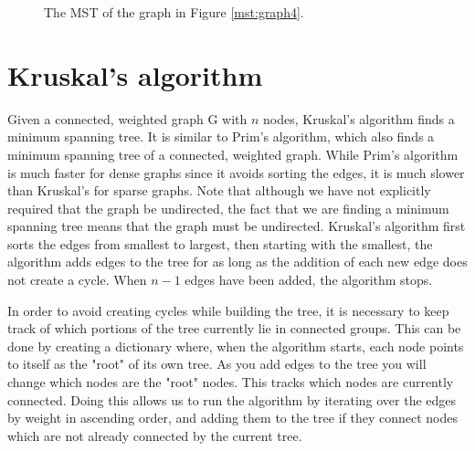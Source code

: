 \begin{figure}[H]
\caption{The MST of the graph in Figure \ref{mst:graph4}.}
\label{mst:graph5}
\end{figure}

\section*{Kruskal's algorithm}

Given a connected, weighted graph G with $n$ nodes, Kruskal's algorithm finds a minimum spanning tree. It is similar to Prim's algorithm, which also finds a minimum spanning tree of a connected, weighted graph. While Prim's algorithm is much faster for dense graphs since it avoids sorting the edges, it is much slower than Kruskal's for sparse graphs. Note that although we have not explicitly required that the graph be undirected, the fact that we are finding a minimum spanning tree means that the graph must be undirected.
Kruskal's algorithm first sorts the edges from smallest to largest, then starting with the smallest, the algorithm adds edges to the tree for as long as the addition of each new edge does not create a cycle.
When $n-1$ edges have been added, the algorithm stops.

In order to avoid creating cycles while building the tree, it is necessary to keep track of which portions of the tree currently lie in connected groups.
This can be done by creating a dictionary where, when the algorithm starts, each node points to itself as the "root" of its own tree.
As you add edges to the tree you will change which nodes are the "root" nodes. This tracks which nodes are currently connected.
Doing this allows us to run the algorithm by iterating over the edges by weight in ascending order, and adding them to the tree if they connect nodes which are not already connected by the current tree.

